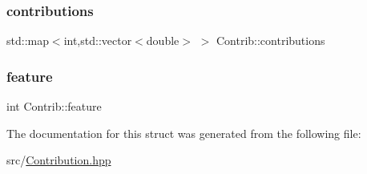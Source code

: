 \subsubsection{\texorpdfstring{contributions}{contributions}}
{\footnotesize\ttfamily std\+::map$<$int,std\+::vector$<$double$>$ $>$ Contrib\+::contributions}

\mbox{\label{structContrib_ad6106fc9377c5d7025631449db2e322c}} 
\subsubsection{\texorpdfstring{feature}{feature}}
{\footnotesize\ttfamily int Contrib\+::feature}



The documentation for this struct was generated from the following file\+:\begin{DoxyCompactItemize}
\item 
src/\hyperlink{Contribution_8hpp}{Contribution.\+hpp}\end{DoxyCompactItemize}
